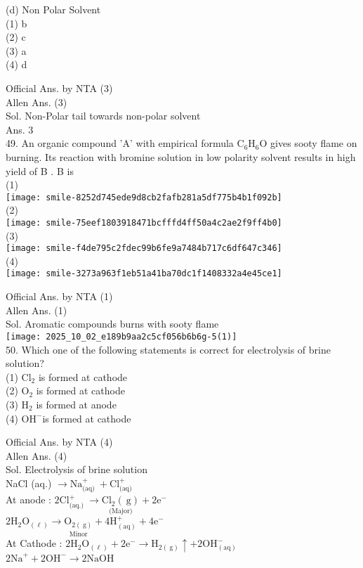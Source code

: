 \documentclass[10pt]{article}
\begin{document}
(d) Non Polar Solvent\\
(1) b\\
(2) c\\
(3) a\\
(4) d

Official Ans. by NTA (3)\\
Allen Ans. (3)\\
Sol. Non-Polar tail towards non-polar solvent\\
Ans. 3\\
49. An organic compound 'A' with empirical formula \(\mathrm{C}_{6} \mathrm{H}_{6} \mathrm{O}\) gives sooty flame on burning. Its reaction with bromine solution in low polarity solvent results in high yield of B . B is\\
(1)\\
\texttt{[image: smile-8252d745ede9d8cb2fafb281a5df775b4b1f092b]}\\
(2)\\
\texttt{[image: smile-75eef1803918471bcfffd4ff50a4c2ae2f9ff4b0]}\\
(3)\\
\texttt{[image: smile-f4de795c2fdec99b6fe9a7484b717c6df647c346]}\\
(4)\\
\texttt{[image: smile-3273a963f1eb51a41ba70dc1f1408332a4e45ce1]}

Official Ans. by NTA (1)\\
Allen Ans. (1)\\
Sol. Aromatic compounds burns with sooty flame\\
\texttt{[image: 2025\_10\_02\_e189b9aa2c5cf056b6b6g-5(1)]}\\
50. Which one of the following statements is correct for electrolysis of brine solution?\\
(1) \(\mathrm{Cl}_{2}\) is formed at cathode\\
(2) \(\mathrm{O}_{2}\) is formed at cathode\\
(3) \(\mathrm{H}_{2}\) is formed at anode\\
(4) \(\mathrm{OH}^{-}\)is formed at cathode

Official Ans. by NTA (4)\\
Allen Ans. (4)\\
Sol. Electrolysis of brine solution\\
NaCl (aq.) \(\longrightarrow \mathrm{Na}_{\text {(aq) }}^{+}+\mathrm{Cl}_{\text {(aq) }}^{+}\)\\
At anode : \(2 \mathrm{Cl}_{\text {(aq.) }}^{+} \longrightarrow \underset{\text { (Major) }}{\mathrm{Cl}_{2}(\mathrm{~g})}+2 \mathrm{e}^{-}\)\\
\(2 \mathrm{H}_{2} \mathrm{O}_{(\ell)} \longrightarrow \underset{\text { Minor }}{\mathrm{O}_{2(\mathrm{~g})}}+4 \mathrm{H}_{(\mathrm{aq})}^{+}+4 \mathrm{e}^{-}\)\\
At Cathode : \(2 \mathrm{H}_{2} \mathrm{O}_{(\ell)}+2 \mathrm{e}^{-} \longrightarrow \mathrm{H}_{2(\mathrm{~g})} \uparrow+2 \mathrm{OH}_{(\mathrm{aq})}^{-}\)\\
\(2 \mathrm{Na}^{+}+2 \mathrm{OH}^{-} \longrightarrow 2 \mathrm{NaOH}\)
\end{document}
